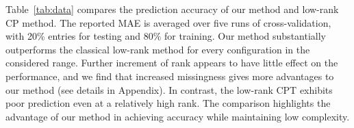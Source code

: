 \documentclass{article}
\theoremstyle{plain}
\theoremstyle{definition}
\begin{document}
\begin{table}[h!]
\vspace{-.1cm}
\vspace{-.2cm}
\caption{Comparison of prediction error in the MRN-114 and NIPS data analysis. For low-rank CPT, we use R function {\tt rTensor} with default hyperparameters, and for our method, we set $H = 20$.}\label{tab:data}
\vspace{-.2cm}
\end{table}


Table~\ref{tab:data} compares the prediction accuracy of our method and low-rank CP method. The reported MAE is averaged over five runs of cross-validation, with 20\% entries for testing and 80\% for training. Our method substantially outperforms the classical low-rank method for every configuration in the considered range. Further increment of rank appears to have little effect on the performance, and we find that increased missingness gives more advantages to our method (see details in Appendix). In contrast, the low-rank CPT exhibits poor prediction even at a relatively high rank. The comparison highlights the advantage of our method in achieving accuracy while maintaining low complexity. 
\end{document}
